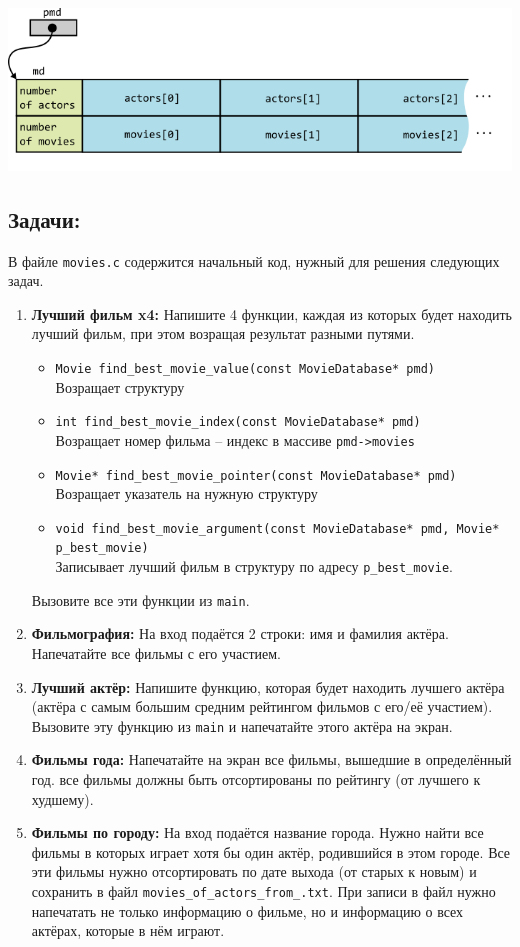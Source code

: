 \documentclass{article}
\begin{document}
\begin{center}
\includegraphics[scale=0.8]{../images/movie_database_structure.png}
\end{center}

\subsection*{Задачи:}
В файле \texttt{movies.c} содержится начальный код, нужный для решения следующих задач.
\begin{enumerate}
\item \textbf{Лучший фильм x4:} Напишите 4 функции, каждая из которых будет находить лучший фильм, при этом возращая результат разными путями. 
\begin{itemize}
\item \texttt{Movie find\_best\_movie\_value(const MovieDatabase* pmd)}\\
Возращает структуру
\item \texttt{int find\_best\_movie\_index(const MovieDatabase* pmd)} \\
Возращает номер фильма -- индекс в массиве \texttt{pmd->movies}
\item \texttt{Movie* find\_best\_movie\_pointer(const MovieDatabase* pmd)}\\
Возращает указатель на нужную структуру
\item \texttt{void find\_best\_movie\_argument(const MovieDatabase* pmd, Movie* p\_best\_movie)}\\
Записывает лучший фильм в структуру по адресу \texttt{p\_best\_movie}.
\end{itemize}
Вызовите все эти функции из \texttt{main}.
\item \textbf{Фильмография:} На вход подаётся 2 строки: имя и фамилия актёра. Напечатайте все фильмы с его участием.
\item \textbf{Лучший актёр:} Напишите функцию, которая будет находить лучшего актёра (актёра с самым большим средним рейтингом фильмов с его/её участием). Вызовите эту функцию из \texttt{main} и напечатайте этого актёра на экран.
\item \textbf{Фильмы года:} Напечатайте на экран все фильмы, вышедшие в определённый год. все фильмы должны быть отсортированы по рейтингу (от лучшего к худшему).
\item \textbf{Фильмы по городу:} На вход подаётся название города. Нужно найти все фильмы в которых играет хотя бы один актёр, родившийся в этом городе. Все эти фильмы нужно отсортировать по дате выхода (от старых к новым) и сохранить в файл \texttt{movies\_of\_actors\_from\_<название города>.txt}. При записи в файл нужно напечатать не только информацию о фильме, но и информацию о всех актёрах, которые в нём играют.
\end{enumerate}
\end{document}
